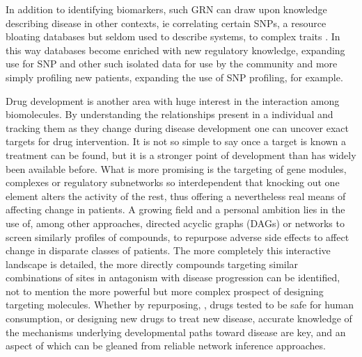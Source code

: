 In addition to identifying biomarkers, such GRN can draw upon knowledge describing disease in other contexts, ie correlating certain SNPs, a resource bloating databases but seldom used to describe systems, to complex traits \cite{platig2016bipartite}. In this way databases become enriched with new regulatory knowledge, expanding use for SNP and other such isolated data for use by the community and more simply profiling new patients, expanding the use of SNP profiling, for example.

Drug development is another area with huge interest in the interaction among biomolecules. By understanding the relationships present in a individual and tracking them as they change during disease development one can uncover exact targets for drug intervention. It is not so simple to say once a target is known a treatment can be found, but it is a stronger point of development than has widely been available before. What is more promising is the targeting of gene modules, complexes or regulatory subnetworks so interdependent that knocking out one element alters the activity of the rest, thus offering a nevertheless real means of affecting change in patients. A growing field and a personal ambition lies in the use of, among other approaches, directed acyclic graphs (DAGs) or networks to screen similarly profiles of compounds, to repurpose adverse side effects to affect change in disparate classes of patients. The more completely this interactive landscape is detailed, the more directly compounds targeting similar combinations of sites in antagonism with disease progression can be identified, not to mention the more powerful but more complex prospect of designing targeting molecules. Whether by repurposing, , drugs tested to be safe for human consumption, or designing new drugs to treat new disease, accurate knowledge of the mechanisms underlying developmental paths toward disease are key, and an aspect of which can be gleaned from reliable network inference approaches.
